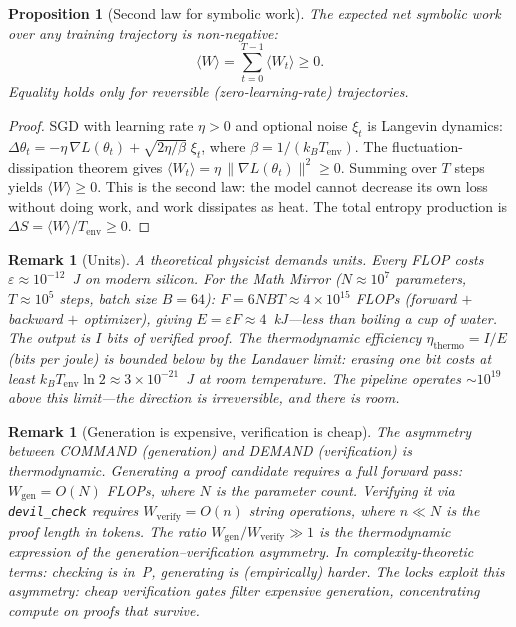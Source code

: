 \documentclass[11pt,a4paper]{article}
\newtheorem{proposition}[theorem]{Proposition}
\newtheorem{remark}[theorem]{Remark}
\newcommand{\norm}[1]{\lVert #1 \rVert}
\begin{document}
\begin{proposition}[Second law for symbolic work]\label{prop:second-law}
The expected net symbolic work over any training trajectory
is non-negative:
\begin{equation}\label{eq:second-law}
  \langle W \rangle
  = \sum_{t=0}^{T-1} \langle W_t \rangle \geq 0.
\end{equation}
Equality holds only for reversible
(zero-learning-rate) trajectories.
\end{proposition}

\begin{proof}
SGD with learning rate $\eta > 0$ and optional noise $\xi_t$
is Langevin dynamics:
$\Delta\theta_t = -\eta\,\nabla L(\theta_t)
  + \sqrt{2\eta / \beta}\;\xi_t$,
where $\beta = 1 / (k_B T_{\mathrm{env}})$.
The fluctuation-dissipation theorem gives
$\langle W_t \rangle
  = \eta\,\norm{\nabla L(\theta_t)}^2 \geq 0$.
Summing over $T$ steps yields
$\langle W \rangle \geq 0$.
This is the second law: the model cannot decrease its own
loss without doing work, and work dissipates as heat.
The total entropy production is
$\Delta S = \langle W \rangle / T_{\mathrm{env}} \geq 0$.
\end{proof}

\begin{remark}[Units]\label{rem:units}
A theoretical physicist demands units.
Every FLOP costs $\varepsilon \approx 10^{-12}$~J on
modern silicon.
For the Math Mirror ($N \approx 10^{7}$ parameters,
$T \approx 10^{5}$ steps, batch size $B = 64$):
$F = 6 N B T \approx 4 \times 10^{15}$ FLOPs
(forward $+$ backward $+$ optimizer),
giving $E = \varepsilon F \approx 4$~kJ---less than boiling
a cup of water.
The output is $I$ bits of verified proof.
The thermodynamic efficiency
$\eta_{\mathrm{thermo}} = I / E$ (bits per joule) is bounded
below by the Landauer limit: erasing one bit costs at least
$k_B T_{\mathrm{env}} \ln 2 \approx 3 \times 10^{-21}$~J
at room temperature.
The pipeline operates $\sim\!10^{19}$ above this
limit---the direction is irreversible, and there is room.
\end{remark}

\begin{remark}[Generation is expensive, verification is
  cheap]\label{rem:gen-verify}
The asymmetry between COMMAND (generation) and DEMAND
(verification) is thermodynamic.
Generating a proof candidate requires a full forward pass:
$W_{\mathrm{gen}} = O(N)$ FLOPs, where $N$ is the
parameter count.
Verifying it via \texttt{devil\_check} requires
$W_{\mathrm{verify}} = O(n)$ string operations,
where $n \ll N$ is the proof length in tokens.
The ratio $W_{\mathrm{gen}} / W_{\mathrm{verify}} \gg 1$
is the thermodynamic expression of the
generation--verification asymmetry.
In complexity-theoretic terms: checking is in~P,
generating is (empirically) harder.
The locks exploit this asymmetry: cheap verification gates
filter expensive generation, concentrating compute on proofs
that survive.
\end{remark}
\end{document}
